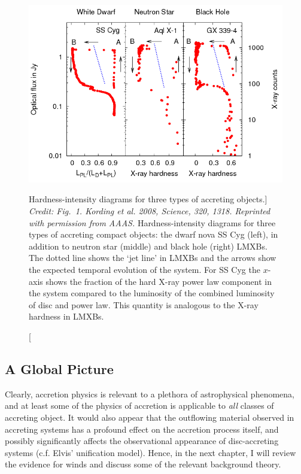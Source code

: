 \begin{figure}
\centering
\includegraphics[width=1.0\textwidth]{figures/01-intro/kording_hid.png}
\caption
[Hardness-intensity diagrams for three types of accreting objects.]
{
{\sl Credit: Fig.~1. Kording et al. 2008, Science, 320, 1318. 
Reprinted with permission from AAAS.} 
Hardness-intensity diagrams for three types of accreting compact objects:
the dwarf nova SS Cyg (left), in addition to neutron star (middle) and black hole (right) 
LMXBs. The dotted line shows the `jet line' in LMXBs and the arrows show the 
expected temporal evolution of the system. For SS Cyg the $x$-axis shows the 
fraction of the hard X-ray power law component in the system compared to the 
luminosity of the combined luminosity of disc and power law. This quantity is
analogous to the X-ray hardness in LMXBs.
} 
\label{fig:kording_hid}
\end{figure}

\subsection{A Global Picture}

Clearly, accretion physics is relevant to a plethora of astrophysical phenomena, 
and at least some of the physics of accretion is applicable to {\em all} 
classes of accreting object. 
It would also appear that the outflowing material observed in accreting systems 
has a profound effect on the accretion process itself, and 
possibly significantly affects the observational 
appearance of disc-accreting systems (c.f. Elvis' unification model). 
Hence, in the next chapter, I will review the evidence for
winds and discuss some of the relevant background theory.

